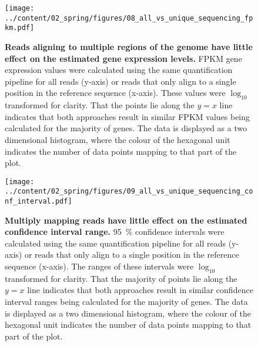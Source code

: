 \documentclass[12pt,]{book}
\begin{document}
\begin{figure}[htbp]
\centering
\texttt{[image: ../content/02\_spring/figures/08\_all\_vs\_unique\_sequencing\_fpkm.pdf]}
\caption{\textbf{Reads aligning to multiple regions of the genome have
little effect on the estimated gene expression levels.} FPKM gene
expression values were calculated using the same quantification pipeline
for all reads (y-axis) or reads that only align to a single position in
the reference sequence (x-axis). These values were \(\log_{10}\)
transformed for clarity. That the points lie along the \(y = x\) line
indicates that both approaches result in similar FPKM values being
calculated for the majority of genes. The data is displayed as a two
dimensional histogram, where the colour of the hexagonal unit indicates
the number of data points mapping to that part of the
plot.}\label{figure:208:uniquefpkm}
\end{figure}

\begin{figure}[htbp]
\centering
\texttt{[image: ../content/02\_spring/figures/09\_all\_vs\_unique\_sequencing\_conf\_interval.pdf]}
\caption{\textbf{Multiply mapping reads have little effect on the
estimated confidence interval range.} 95~\% confidence intervals were
calculated using the same quantification pipeline for all reads (y-axis)
or reads that only align to a single position in the reference sequence
(x-axis). The ranges of these intervals were \(\log_{10}\) transformed
for clarity. That the majority of points lie along the \(y = x\) line
indicates that both approaches result in similar confidence interval
ranges being calculated for the majority of genes. The data is displayed
as a two dimensional histogram, where the colour of the hexagonal unit
indicates the number of data points mapping to that part of the
plot.}\label{figure:209:uniqueconf}
\end{figure}
\end{document}
